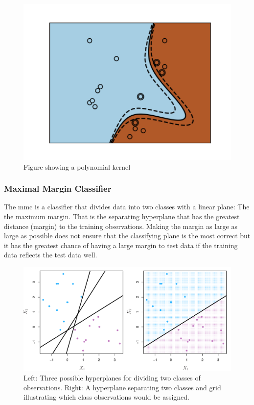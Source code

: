 \documentclass[11pt]{article}
\begin{document}
\begin{figure}[ht]
  \centering
  \includegraphics[width=12cm]{graphics/kernel_poly.png}
  \caption{Figure showing a polynomial kernel\cite{SVMKernelsScikitlearn24}}
\end{figure}

\subsubsection{Maximal Margin Classifier}
The \gls{mmc} is a classifier that divides data into two classes with a linear plane: The the maximum margin. That is the separating hyperplane that has the greatest distance (margin) to the training observations. Making the margin as large as large as possible does not ensure that the classifying plane is the most correct but it has the greatest chance of having a large margin to test data if the training data reflects the test data well.\cite{jamesSupportVectorMachines}\cite{HyperplaneSeparationTheorem2021}

\begin{figure}[ht]
  \centering
  \includegraphics[width=12cm]{graphics/9_2.pdf}
  \caption{Left: Three possible hyperplanes for dividing two classes of observations. Right: A hyperplane separating two classes and grid illustrating which class observations would be assigned.\cite{jamesSupportVectorMachines}}
\end{figure}
\end{document}

